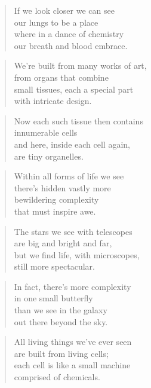 \documentclass[10pt,a4paper]{article}
\begin{document}
\begin{paracol}{2}
\begin{verse}
If we look closer we can see\\
our lungs to be a place\\
where in a dance of chemistry\\
our breath and blood embrace.
\end{verse}

\begin{verse}
We’re built from many works of art,\\
from organs that combine\\
small tissues, each a special part\\
with intricate design.
\end{verse}

\begin{verse}
Now each such tissue then contains\\
innumerable cells\\
and here, inside each cell again,\\
are tiny organelles.
\end{verse}

\begin{verse}
Within all forms of life we see\\
there’s hidden vastly more\\
bewildering complexity\\
that must inspire awe.
\end{verse}

\begin{verse}
The stars we see with telescopes\\
are big and bright and far,\\
but we find life, with microscopes,\\
still more spectacular.
\end{verse}

\begin{verse}
In fact, there’s more complexity\\
in one small butterfly\\
than we see in the galaxy\\
out there beyond the sky.
\end{verse}

\begin{verse}
All living things we’ve ever seen\\
are built from living cells;\\
each cell is like a small machine\\
comprised of chemicals.
\end{verse}


\end{paracol}
\end{document}
